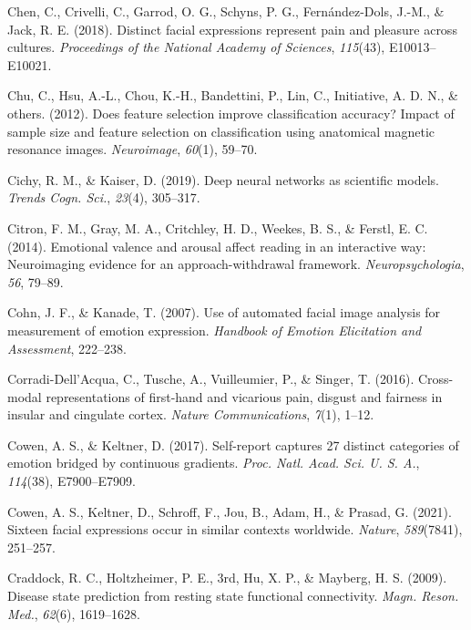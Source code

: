 \documentclass[11pt,american,a4paper,oneside,]{memoir} %
\begin{document}
\leavevmode\hypertarget{ref-chen2018distinct}{}%
Chen, C., Crivelli, C., Garrod, O. G., Schyns, P. G., Fernández-Dols, J.-M., \& Jack, R. E. (2018). Distinct facial expressions represent pain and pleasure across cultures. \emph{Proceedings of the National Academy of Sciences}, \emph{115}(43), E10013--E10021.

\leavevmode\hypertarget{ref-chu2012does}{}%
Chu, C., Hsu, A.-L., Chou, K.-H., Bandettini, P., Lin, C., Initiative, A. D. N., \& others. (2012). Does feature selection improve classification accuracy? Impact of sample size and feature selection on classification using anatomical magnetic resonance images. \emph{Neuroimage}, \emph{60}(1), 59--70.

\leavevmode\hypertarget{ref-Cichy2019-zf}{}%
Cichy, R. M., \& Kaiser, D. (2019). Deep neural networks as scientific models. \emph{Trends Cogn. Sci.}, \emph{23}(4), 305--317.

\leavevmode\hypertarget{ref-citron2014emotional}{}%
Citron, F. M., Gray, M. A., Critchley, H. D., Weekes, B. S., \& Ferstl, E. C. (2014). Emotional valence and arousal affect reading in an interactive way: Neuroimaging evidence for an approach-withdrawal framework. \emph{Neuropsychologia}, \emph{56}, 79--89.

\leavevmode\hypertarget{ref-Cohn2007-xe}{}%
Cohn, J. F., \& Kanade, T. (2007). Use of automated facial image analysis for measurement of emotion expression. \emph{Handbook of Emotion Elicitation and Assessment}, 222--238.

\leavevmode\hypertarget{ref-corradi2016cross}{}%
Corradi-Dell'Acqua, C., Tusche, A., Vuilleumier, P., \& Singer, T. (2016). Cross-modal representations of first-hand and vicarious pain, disgust and fairness in insular and cingulate cortex. \emph{Nature Communications}, \emph{7}(1), 1--12.

\leavevmode\hypertarget{ref-Cowen2017-vz}{}%
Cowen, A. S., \& Keltner, D. (2017). Self-report captures 27 distinct categories of emotion bridged by continuous gradients. \emph{Proc. Natl. Acad. Sci. U. S. A.}, \emph{114}(38), E7900--E7909.

\leavevmode\hypertarget{ref-Cowen2021-ld}{}%
Cowen, A. S., Keltner, D., Schroff, F., Jou, B., Adam, H., \& Prasad, G. (2021). Sixteen facial expressions occur in similar contexts worldwide. \emph{Nature}, \emph{589}(7841), 251--257.

\leavevmode\hypertarget{ref-Craddock2009-kz}{}%
Craddock, R. C., Holtzheimer, P. E., 3rd, Hu, X. P., \& Mayberg, H. S. (2009). Disease state prediction from resting state functional connectivity. \emph{Magn. Reson. Med.}, \emph{62}(6), 1619--1628.
\end{document}
